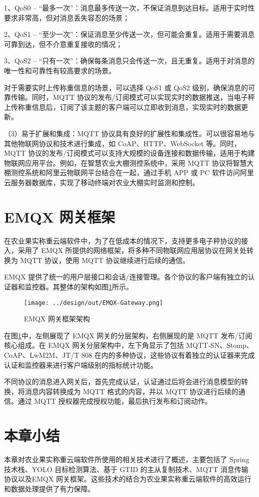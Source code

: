 1、QoS0 – “最多一次”：消息最多传送一次，不保证消息到达目标。适用于实时性要求非常高，但对消息丢失容忍的场景；

2、QoS1 – “至少一次”：保证消息至少传送一次，但可能会重复。适用于需要消息可靠到达，但不介意重复接收的情况；

3、QoS2 – “只有一次”：确保每条消息只会传送一次，且无重复。适用于对消息的唯一性和可靠性有较高要求的场景。

对于需要实时上传称重信息的场景，可以选择 QoS1 或 QoS2 级别，确保消息的可靠传输。同时，MQTT 协议的发布/订阅模式可以实现实时的数据推送，当电子秤上传称重信息后，订阅了该主题的客户端可以立即收到消息，实现实时的数据更新。

（3）易于扩展和集成：MQTT 协议具有良好的扩展性和集成性。可以很容易地与其他物联网协议和技术进行集成，如 CoAP、HTTP、WebSocket 等。同时，MQTT 协议的发布/订阅模式可以支持大规模的设备连接和数据传输，适用于构建物联网应用平台。例如，在智慧农业大棚测控系统中，采用 MQTT 协议将智慧大棚测控系统和阿里云物联网平台结合在一起，通过手机 APP 或 PC 软件访问阿里云服务器数据库，实现了移动终端对农业大棚实时监测和控制\cite{Liang2020}。

\section{EMQX 网关框架}\label{sec:emqx}

在农业果实称重云端软件中，为了在低成本的情况下，支持更多电子秤协议的接入，采用了 EMQX 所提供的网络框架，将多种不同物联网应用层协议在网关处转换为 MQTT 协议，使用 MQTT 协议继续进行后续的通信。

EMQX 提供了统一的用户层接口和会话/连接管理。各个协议的客户端有独立的认证器和监控器\cite{EMQX-Gateway}。其整体的架构如图\ref{fig:EMQX-Gateway}所示。

\begin{figure}[H]
    \centering
    \texttt{[image: ../design/out/EMQX-Gateway.png]}
    \caption{EMQX 网关框架架构}
    \label{fig:EMQX-Gateway}
\end{figure}

在图\ref{fig:EMQX-Gateway}中，左侧展现了 EMQX 网关的分层架构，右侧展现的是 MQTT 发布/订阅核心组成。在 EMQX 网关分层架构中，左下角显示了包括 MQTT-SN、Stomp、CoAP、LwM2M、JT/T 808 在内的多种协议，这些协议有着独立的认证器来完成认证和监控器来进行客户端级别的指标统计功能。

不同协议的消息进入网关后，首先完成认证，认证通过后将会进行消息模型的转换，将消息内容转换成为 MQTT 格式的内容，并以 MQTT 协议进行后续的通信。通过 MQTT 授权器完成授权功能，最后执行发布和订阅动作。

\section{本章小结}

本章对农业果实称重云端软件所使用的相关技术进行了概述，主要包括了 Spring 技术栈、YOLO 目标检测算法、基于 GTID 的主从复制技术、MQTT 消息传输协议以及EMQX 网关框架。这些技术的结合为农业果实称重云端软件的高效运行和数据处理提供了有力保障。
